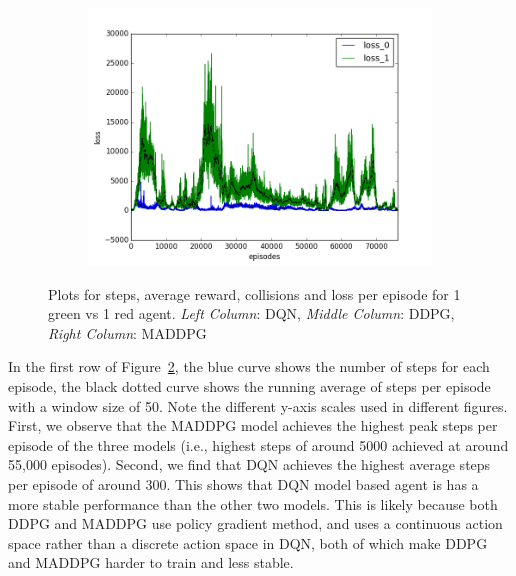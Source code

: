 \begin{figure}[t]
\begin{subfigure}[t]{\figscale\linewidth}
    \includegraphics[width=1.5\textwidth]
    {../results/maddpg_1vs1/loss.png}
    \label{fig:maddpg-1vs1-loss}
  \end{subfigure}

  \caption{Plots for steps, average reward, collisions and loss per episode for 1 green vs 1 red agent. \textit{Left Column}: DQN, \textit{Middle Column}: DDPG, \textit{Right Column}: MADDPG}
  \label{fig:1vs1}
\end{figure}
\FloatBarrier

In the first row of Figure~\ref{fig:1vs1}, the blue curve shows the number of
steps for each episode, the black dotted curve shows the running average of
steps per episode with a window size of 50. Note the different y-axis scales
used in different figures. First, we observe that the MADDPG model achieves the
highest peak steps per episode of the three models (i.e., highest steps of
around 5000 achieved at around 55,000 episodes). Second, we find that DQN
achieves the highest average steps per episode of around 300. This shows that
DQN model based agent is has a more stable performance than the other two
models. This is likely because both DDPG and MADDPG use policy gradient method,
and uses a continuous action space rather than a discrete action space in DQN,
both of which make DDPG and MADDPG harder to train and less stable.

